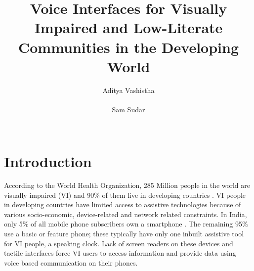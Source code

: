 \documentclass{sigchi}
\begin{document}
\title{Voice Interfaces for Visually Impaired and Low-Literate Communities in the Developing World}

\author{
  \alignauthor Aditya Vashistha\\
    \\
   \alignauthor Sam Sudar\\
    \\}

\maketitle

\section{Introduction}
According to the World Health Organization, 285 Million people in the world are visually impaired (VI) and 90\% of them live in developing countries \cite{WHO2013}. VI people in developing countries have limited access to assistive technologies because of various socio-economic, device-related and network related constraints. In India, only
5\% of all mobile phone subscribers own a smartphone \cite{Mary2013}. The remaining 95\% use a basic or feature phone; these typically have only one inbuilt assistive tool for VI people, a speaking clock. Lack of screen readers on these devices and tactile interfaces force VI users to access information and provide data using voice based communication on their phones. 
\end{document}
